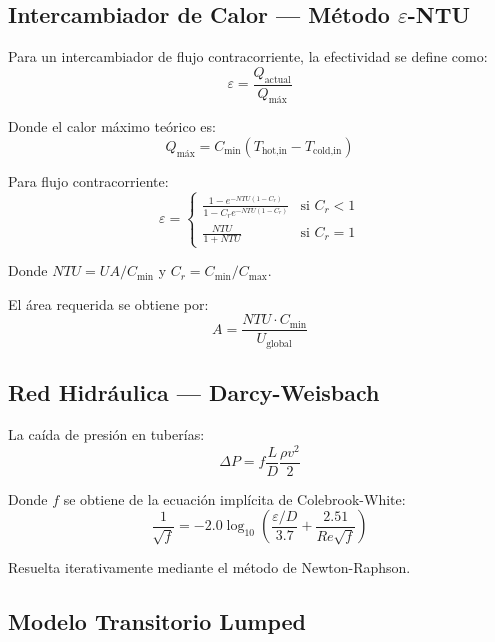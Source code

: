 \documentclass[11pt,a4paper]{report}
\begin{document}
\subsection{Intercambiador de Calor — Método $\varepsilon$-NTU}

Para un intercambiador de flujo contracorriente, la efectividad se define como:
\begin{equation}
\varepsilon = \frac{Q_{\text{actual}}}{Q_{\text{máx}}}
\end{equation}

Donde el calor máximo teórico es:
\begin{equation}
Q_{\text{máx}} = C_{\text{min}}(T_{\text{hot,in}} - T_{\text{cold,in}})
\end{equation}

Para flujo contracorriente:
\begin{equation}
\varepsilon = \begin{cases}
\frac{1 - e^{-NTU(1 - C_r)}}{1 - C_r e^{-NTU(1 - C_r)}} & \text{si } C_r < 1 \\[0.5em]
\frac{NTU}{1 + NTU} & \text{si } C_r = 1
\end{cases}
\end{equation}

Donde $NTU = UA/C_{\text{min}}$ y $C_r = C_{\text{min}}/C_{\text{max}}$.

El área requerida se obtiene por:
\begin{equation}
A = \frac{NTU \cdot C_{\text{min}}}{U_{\text{global}}}
\end{equation}

\subsection{Red Hidráulica — Darcy-Weisbach}

La caída de presión en tuberías:
\begin{equation}
\Delta P = f \frac{L}{D} \frac{\rho v^2}{2}
\end{equation}

Donde $f$ se obtiene de la ecuación implícita de Colebrook-White:
\begin{equation}
\frac{1}{\sqrt{f}} = -2.0 \log_{10}\left(\frac{\varepsilon/D}{3.7} + \frac{2.51}{Re\sqrt{f}}\right)
\end{equation}

Resuelta iterativamente mediante el método de Newton-Raphson.

\subsection{Modelo Transitorio Lumped}
\end{document}
